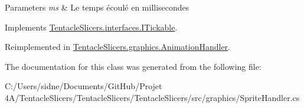 \begin{DoxyParams}{Parameters}
{\em ms} & Le temps écoulé en millisecondes \\
\hline
\end{DoxyParams}


Implements \hyperlink{interface_tentacle_slicers_1_1interfaces_1_1_i_tickable}{Tentacle\+Slicers.\+interfaces.\+I\+Tickable}.



Reimplemented in \hyperlink{class_tentacle_slicers_1_1graphics_1_1_animation_handler_a898fe508064f17af1e1fed3b5470ed0c}{Tentacle\+Slicers.\+graphics.\+Animation\+Handler}.



The documentation for this class was generated from the following file\+:\begin{DoxyCompactItemize}
\item 
C\+:/\+Users/sidne/\+Documents/\+Git\+Hub/\+Projet 4\+A/\+Tentacle\+Slicers/\+Tentacle\+Slicers/\+Tentacle\+Slicers/src/graphics/Sprite\+Handler.\+cs\end{DoxyCompactItemize}
